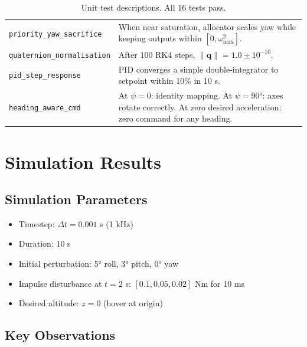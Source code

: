 \documentclass[12pt, a4paper]{article}
\newcommand{\bq}{\bm{q}}
\begin{document}
\begin{table}[H]
\begin{tabular}{lp{8cm}}
\texttt{priority\_yaw\_sacrifice} & When near saturation, allocator scales yaw while keeping outputs within $[0, \omega_{\max}^2]$. \\
\texttt{quaternion\_normalisation} & After 100 RK4 steps, $\|\bq\| = 1.0 \pm 10^{-10}$. \\
\texttt{pid\_step\_response} & PID converges a simple double-integrator to setpoint within 10\% in 10 s. \\
\texttt{heading\_aware\_cmd} & At $\psi = 0$: identity mapping.  At $\psi = 90°$: axes rotate correctly.  At zero desired acceleration: zero command for any heading. \\
\bottomrule
\end{tabular}
\caption{Unit test descriptions.  All 16 tests pass.}
\end{table}

\section{Simulation Results}
\label{sec:results}

\subsection{Simulation Parameters}

\begin{itemize}
    \item Timestep: $\Delta t = 0.001$ s (1 kHz)
    \item Duration: 10 s
    \item Initial perturbation: 5° roll, 3° pitch, 0° yaw
    \item Impulse disturbance at $t = 2$ s: $[0.1, 0.05, 0.02]$ Nm for 10 ms
    \item Desired altitude: $z = 0$ (hover at origin)
\end{itemize}

\subsection{Key Observations}
\end{document}
